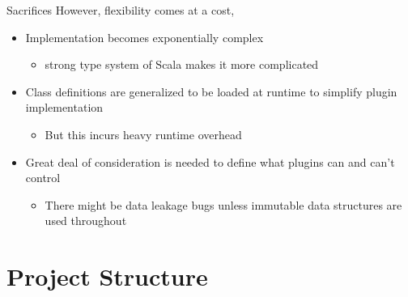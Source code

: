 \documentclass[compress, aspectratio=169]{beamer}
\begin{document}
\begin{frame}{Sacrifices}
    However, flexibility comes at a cost,
    \begin{itemize}[<+->]
        \item Implementation becomes exponentially complex
            \begin{itemize}
                \item strong type system of Scala makes it more complicated
            \end{itemize}
        \item Class definitions are generalized to be loaded at runtime to simplify
            plugin implementation
            \begin{itemize}
                \item But this incurs heavy runtime overhead
            \end{itemize}
        \item Great deal of consideration is needed to define what plugins can and
            can't control
            \begin{itemize}
                \item There might be data leakage bugs unless immutable data structures
                    are used throughout
            \end{itemize}
    \end{itemize}
\end{frame}

\section{Project Structure}
\end{document}
